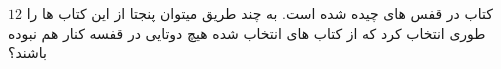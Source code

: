 \exercise
$12$
 کتاب در قفس های چیده شده است. به چند طریق میتوان پنجتا از این کتاب ها را طوری انتخاب کرد که از کتاب های انتخاب شده هیچ دوتایی در قفسه کنار هم نبوده باشند؟